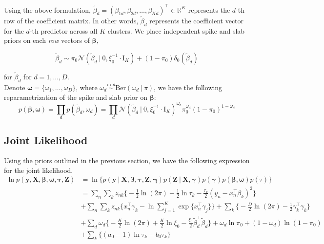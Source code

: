 \documentclass[twoside,11pt]{article}
\newcommand\given[1][]{\:#1\vert\:}
\newcommand{\transpose}[1]{#1^{\intercal}}
\newcommand{\R}{\mathbb{R}}
\newcommand{\nsum}{\sum\limits_{n}}
\newcommand{\ksum}{\sum\limits_{k}}
\newcommand{\boldbeta}{\boldsymbol\beta}
\newcommand{\boldgamma}{\boldsymbol\gamma}
\newcommand{\boldtau}{\boldsymbol\tau}
\newcommand{\sumexp}{\sum_{j=1}^{K} \exp \{ \transpose{x_n} \gamma_j \}}
\newcommand{\iid}{\overset{i.i.d}{\sim}}
\newcommand{\betad}{\tilde{\beta}_d}
\newcommand{\priorbeta}{\mathcal{N} \left( \betad \given 0, \xi_0^{-1} \cdot \mathrm{I}_K \right)}
\newcommand{\pr}[1]{p \left( #1 \right)}
\begin{document}
Using the above formulation, $\betad = \transpose{\left( \beta_{1d}, \beta_{2d}, \ldots, \beta_{Kd}\right)} \in \R^K$ represents the $d$-th row of the coefficient matrix. In other words, $\betad$ represents the coefficient vector for the $d$-th predictor across all $K$ clusters. We place independent spike and slab priors on each \textit{row} vectors of $\boldbeta$, 

\begin{equation} 
	\betad \sim \pi_0 \priorbeta + (1 - \pi_0) \delta_0 (\betad)
\end{equation}

for $\betad$ for $d = 1, \ldots, D$. \\

Denote $\boldsymbol \omega = \{ \omega_1, \ldots, \omega_D\}$, where $\omega_d \iid \mathrm{Ber}(\omega_d \given \pi)$, we have the following reparametrization of the spike and slab prior on $\boldbeta$:
\begin{equation} \label{eq:beta_joint_prior_vs}
	\pr{\boldbeta, \boldsymbol\omega} = \prod_{d} \pr{\betad, \omega_d} = \prod_{d} \priorbeta^{\omega_d} \pi_0^{\omega_d} (1-\pi_0)^{1 - \omega_d}
\end{equation}

\subsection{Joint Likelihood}
Using the priors outlined in the previous section, we have the following expression for the joint likelihood. 
\begin{equation} \label{eq:joint_vs}
\begin{split}
	\ln  \pr{\mathbf{y}, \mathbf{X}, \boldbeta, \boldsymbol\omega, \boldtau, \mathbf{Z}} &= 
	\ln \bigg\{\pr{\mathbf{y} \given \mathbf{X}, \boldsymbol\beta, \boldsymbol{\tau}, \mathbf{Z}, \boldsymbol\gamma}\pr{\mathbf{Z}\given \mathbf{X}, \boldgamma}\pr{\boldgamma}\pr{\boldbeta, \boldsymbol\omega}\pr{\tau} \bigg\}\\
	&= \nsum \ksum z_{nk}\bigg\{ -\frac{1}{2}\ln(2\pi) + \frac{1}{2} \ln \tau_k - \frac{\tau_k}{2} \left( y_n - \transpose{x_n}\beta_k\right)^2 \bigg\} \\
	& + \nsum \ksum z_{nk} \bigg\{ \transpose{x_n} \gamma_k - \ln \sumexp  \bigg\} + \ksum \bigg\{ -\frac{D}{2} \ln (2\pi) - \frac{1}{2} \transpose{\gamma_k}\gamma_k \bigg\} \\
	& + \sum_{d} \omega_d \bigg\{ -\frac{K}{2} \ln(2\pi) + \frac{K}{2} \ln \xi_0 - \frac{\xi_0}{2} \transpose{\betad} \betad\bigg\} + \omega_d \ln \pi_0 + ( 1- \omega_d) \ln(1 - \pi_0) \\
	& + \ksum \bigg\{ (a_0 - 1) \ln \tau_k - b_0 \tau_k \bigg\}
\end{split}
\end{equation}
\end{document}
